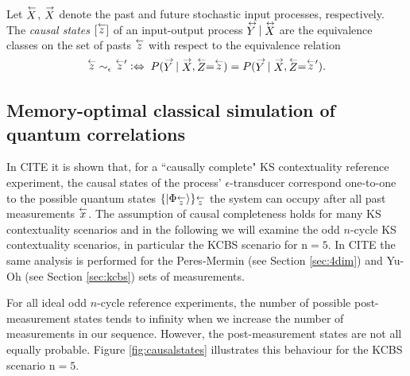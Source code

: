 \begin{definition}
Let $\oset{\leftarrow}{X}$, $\oset{\rightarrow}{X}$ denote the past and future stochastic input processes, respectively.
The \emph{causal states} $[\oset{\leftarrow}{z}]$ of an input-output process $\oset{\leftrightarrow}{Y}|\oset{\leftrightarrow}{X}$ are the equivalence classes on the set of pasts $\oset{\leftarrow}{z}$ with respect to the equivalence relation
\begin{equation*}
\oset{\leftarrow}{z}\;\sim_\epsilon\;\oset{\leftarrow}{z}'\;\mathrel{\vcentcolon\Leftrightarrow} \;P(\oset{\rightarrow}{Y}|\oset{\rightarrow}{X},\oset{\leftarrow}{Z}=\oset{\leftarrow}{z})= P(\oset{\rightarrow}{Y}|\oset{\rightarrow}{X},\oset{\leftarrow}{Z}=\oset{\leftarrow}{z}').
\end{equation*}
\end{definition}

\subsection{Memory-optimal classical simulation of quantum correlations}
In CITE it is shown that, for a ``causally complete" KS contextuality reference experiment, the causal states of the process' $\epsilon$-transducer correspond one-to-one to the possible quantum states $\{\ket{\Phi_{\oset{\leftarrow}{z}}}\}_{\oset{\leftarrow}{z}}$ the system can occupy after all past measurements $\oset{\leftarrow}{x}$. The assumption of causal completeness holds for many KS contextuality scenarios and in the following we will examine the odd $n$-cycle KS contextuality scenarios, in particular the KCBS scenario for $\text{n}=5$. In CITE the same analysis is performed for the Peres-Mermin (see Section \ref{sec:4dim}) and Yu-Oh (see Section \ref{sec:kcbs}) sets of measurements.

For all ideal odd $n$-cycle reference experiments, the number of possible post-measurement states tends to infinity when we increase the number of measurements in our sequence. However, the post-measurement states are not all equally probable. Figure \ref{fig:causalstates} illustrates this behaviour for the KCBS scenario $\text{n}=5$.

